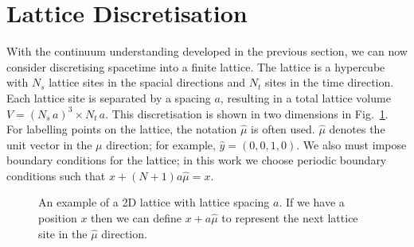 \section{Lattice Discretisation}\label{sec:LatticeDiscretisation}
With the continuum understanding developed in the previous section, we can now consider discretising spacetime into a finite lattice. The lattice is a hypercube with $N_s$ lattice sites in the spacial directions and $N_t$ sites in the time direction. Each lattice site is separated by a spacing $a$, resulting in a total lattice volume $V=(N_s\,a)^3\times N_t\,a$. This discretisation is shown in two dimensions in Fig.~\ref{fig:LatticeExample}. For labelling points on the lattice, the notation $\hat{\mu}$ is often used. $\hat{\mu}$ denotes the unit vector in the $\mu$ direction; for example, $\hat{y} = (0,0,1,0)$. We also must impose boundary conditions for the lattice; in this work we choose periodic boundary conditions such that $x+(N+1)a\hat{\mu}=x$.\\
%
\begin{figure}[h]
\centering
{}
\caption{\label{fig:LatticeExample}An example of a 2D lattice with lattice spacing $a$. If we have a position $x$ then we can define $x+a\hat{\mu}$ to represent the next lattice site in the $\hat{\mu}$ direction.}
\end{figure}
%

